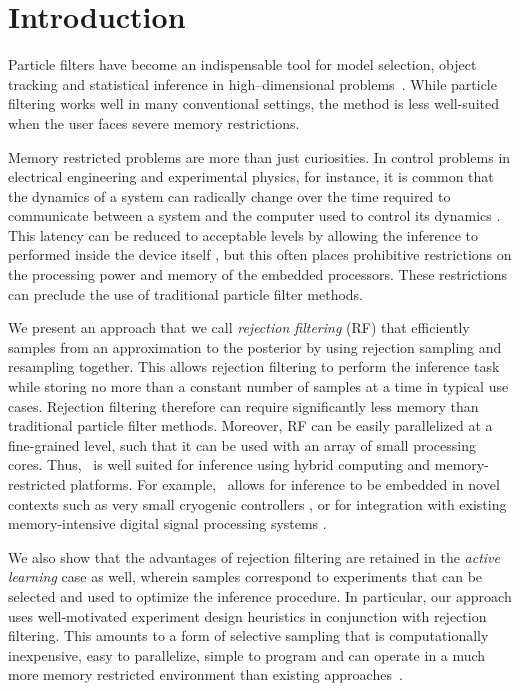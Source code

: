 \documentclass{article} %
\newcommand{\CRej}{\text{rejection filtering}}
\begin{document}
\section{Introduction}
\label{sec:intro}

Particle filters have become an indispensable tool for model selection, object tracking
and statistical inference in
high--dimensional problems~\cite{doucet2000sequential,del2012adaptive,van2000unscented,liu2001combined}. 
While particle filtering works well in many conventional settings, 
the method is less well-suited when the
user faces severe memory restrictions.  

Memory restricted problems are more than just curiosities. In control problems
in electrical engineering and experimental physics, for instance,
it is common that the dynamics of
a system can radically change over the time required to communicate between a system
and the computer used to control its dynamics \cite{halloin_long_2013,shulman_suppressing_2014}.  This latency can be reduced to acceptable levels by allowing the inference to performed inside
the device itself \cite{lavalle_sensor_2013}, but this often places prohibitive restrictions on the processing power and memory of the embedded processors.
These restrictions can preclude the use of traditional particle filter methods.

We present an approach that we call \emph{rejection filtering} (RF) that efficiently samples from
an approximation to the posterior by using rejection sampling and resampling together.
This allows rejection filtering to perform the inference task while storing no more
than a constant number of samples at a time in typical use cases.
Rejection filtering therefore can require significantly
less memory than traditional particle filter methods. Moreover, RF can be
easily parallelized at a fine-grained level, such that it can be used with an
array of small processing cores. Thus, \CRej~is well suited for inference
 using hybrid computing and memory-restricted platforms.
For example, \CRej~allows for inference to be embedded in novel contexts such
as very small cryogenic controllers \cite{hornibrook_cryogenic_2015}, or for
integration with existing memory-intensive digital signal processing systems
\cite{casagrande_design_2014}.

We also show that the advantages of rejection filtering are retained in the \emph{active learning} case as well,
wherein samples correspond to experiments that can be selected and used to optimize the inference procedure.
In particular, our approach uses well-motivated experiment design heuristics in conjunction with rejection
filtering.
This amounts to a form of selective sampling that is computationally inexpensive, easy to parallelize, simple to program and can operate in a much more memory restricted environment than existing approaches~\cite{sivaraman2010general,kapoor2007active}.
\end{document}
